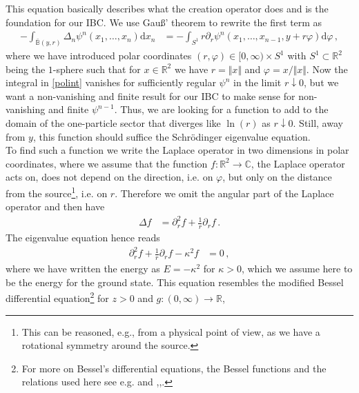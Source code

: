 This equation basically describes what the creation operator does and is the foundation for our IBC. We use Gau{\ss}' theorem to rewrite the first term as
\begin{align}
\label{polint}
  -
  \int_{\bar{\mathbb{B}}(y,r)}
  \Delta_{n}\psi^{n}
  \left(
    x_{1}
    ,
    \dots
    ,
    x_{n}
  \right)
  \mathrm{d}x_{n}
  &=
  -
  \int_{S^{1}}
  r
  \partial_{r}
  \psi^{n}
  \left(
    x_{1}
    ,
    \dots
    ,
    x_{n-1}
    ,
    y
    +
    r
    \varphi
  \right)
  \mathrm{d}\varphi
  \,,
\end{align}
where we have introduced polar coordinates $(r,\varphi) \in [0,\infty) \times S^{1}$ with $S^{1} \subset \mathbb{R}^{2}$ being the $1$-sphere such that for $x \in \mathbb{R}^{2}$ we have $r = \Vert x \Vert$ and $\varphi = x/\Vert x \Vert$. Now the integral in \eqref{polint} vanishes for sufficiently regular $\psi^{n}$ in the limit $r \downarrow 0$, but we want a non-vanishing and finite result for our IBC to make sense for non-vanishing and finite $\psi^{n-1}$. Thus, we are looking for a function to add to the domain of the one-particle sector that diverges like $\ln(r)$ as $r \downarrow 0$. Still, away from $y$, this function should suffice the Schr\"odinger eigenvalue equation.
\\
To find such a function we write the Laplace operator in two dimensions in polar coordinates, where we assume that the function $f \colon \mathbb{R}^{2} \to \mathbb{C}$, the Laplace operator acts on, does not depend on the {\glqq}direction{\grqq}, i.e. on $\varphi$, but only on the {\glqq}distance from the source{\grqq}\footnote{This can be reasoned, e.g., from a physical point of view, as we have a rotational symmetry around the source.}, i.e. on $r$. Therefore we omit the angular part of the Laplace operator and then have
\begin{align*}
  \Delta f
  &=
  \partial_{r}^{2}
  f
  +
  \frac{1}{r}
  \partial_{r}
  f
  \,.
\end{align*}
The eigenvalue equation hence reads
\begin{align*}
  \partial_{r}^{2}
  f
  +
  \frac{1}{r}
  \partial_{r}
  f
  -
  \kappa^{2}
  f
  &=
  0
  \,,
\end{align*}
where we have written the energy as $E = -\kappa^{2}$ for $\kappa > 0$, which we assume here to be the energy for the ground state. This equation resembles the modified Bessel differential equation\footnote{For more on Bessel's differential equations, the Bessel functions and the relations used here see e.g. \cite{29f54c49} and \cite{ca427945},\cite{69346099},\cite{35763ba8}.} for $z > 0$ and $g \colon (0,\infty) \to \mathbb{R}$,
